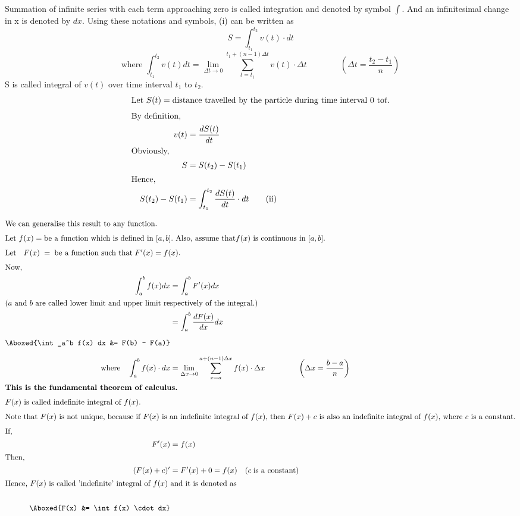 {Summation of infinite series with each term approaching zero is called integration and denoted by symbol $\int$. And an infinitesimal change in x is denoted by $dx$. Using these notations and symbols, (i) can be written as
\[S = \int_{t_1}^{t_2}v(t)\cdot dt \]
\[\text{where } \int_{t_1}^{t_2} v(t) dt = \lim_{\Delta t \to 0} \sum_{t=t_1}^{t_1+(n-1)\Delta t} v(t) \cdot \Delta t \qquad \qquad \left(\Delta t = \frac{t_2 - t_1}{n}\right) \]
S is called integral of \( v(t) \) over time interval \( t_1 \) to \( t_2 \).\\[2mm]
\begin{align*}
    \intertext{Let  $S(t) = \text{distance travelled by the particle during time interval 0 to} t$.}
    \intertext{By definition,} 
    \quad v(t) &= \frac{dS(t)}{dt}\\
    \intertext{Obviously,} 
    \quad S &= S(t_2) - S(t_1)\\
    \intertext{Hence,} 
    \quad S(t_2) - S(t_1) &= \int_{t_1}^{t_2}\frac{dS(t)}{dt} \cdot dt \tag{ii}\\
\end{align*}
\begin{align*}
    \intertext{We can generalise this result to any function.}
    \intertext{Let  $f(x) =  \text{be a function which is defined in } [a, b].  \text{ Also, assume that}  f(x)   \text{ is continuous in } [a, b]$.} 
    \intertext{Let \; $F(x) \; = \; \text{be a function such that} \; F'(x) = f(x).$}
    \intertext{Now, }
    \int_a^b f(x) dx &= \int_a^b F'(x) dx\\
    \intertext{($a$ and $b$ are called lower limit and upper limit respectively of the integral.)}
    &= \int_a^b \frac{dF(x)}{dx} dx\\[2mm]
    \Aboxed{\int_a^b f(x) dx &= F(b) - F(a)}\\[2mm]
    \text{where} \quad \int_{a}^{b} f(x) \cdot dx &= \lim_{\Delta x \to 0} \sum_{x=a}^{a+(n-1)\Delta x} f(x) \cdot \Delta x \; \qquad \qquad \left(\Delta x = \frac{b - a}{n}\right) \\
    \intertext{\textbf{This is the fundamental theorem of calculus.}}
    \intertext{$F(x)$ is called indefinite integral of $f(x)$.} 
    \intertext{Note that $F(x)$ is not unique, because if $F(x)$ is an indefinite integral of $f(x)$, then $F(x) + c$ is also an indefinite integral of $f(x)$, where $c$ is a constant.}
    \intertext{If,}
    \quad F'(x) &= f(x)\\
    \intertext{Then,}
    \quad (F(x) + c)' &= F'(x) + 0 = f(x) \quad (c \; \text{is a constant})\\
    \intertext{Hence, $F(x)$ is called 'indefinite' integral of $f(x)$ and it is denoted as}\\
    \Aboxed{F(x) &= \int f(x) \cdot dx}
\end{align*}
}

